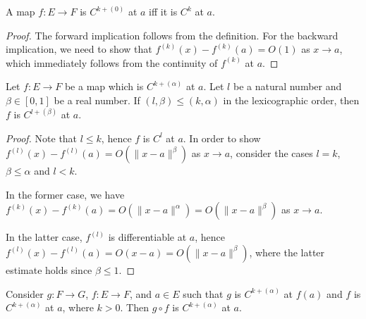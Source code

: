 \begin{lemma}%
  \label{lem:cdh-at-zero}
  A map \(f\colon E\to F\) is \(C^{k+(0)}\) at \(a\) iff it is \(C^{k}\) at \(a\).
\end{lemma}

\begin{proof}
  The forward implication follows from the definition.
  For the backward implication,
  we need to show that \(f^{(k)}(x) - f^{(k)}(a)=O(1)\) as \(x\to a\),
  which immediately follows from the continuity of \(f^{(k)}\) at \(a\).
\end{proof}

\begin{lemma}%
  \label{lem:cdh-at-mono}
  Let \(f\colon E\to F\) be a map which is \(C^{k+(\alpha)}\) at \(a\).
  Let \(l\) be a natural number and \(\beta \in [0, 1]\) be a real number.
  If \((l, \beta) \le (k, \alpha)\) in the lexicographic order,
  then \(f\) is \(C^{l+(\beta)}\) at \(a\).
\end{lemma}

\begin{proof}
  Note that \(l\le k\), hence \(f\) is \(C^{l}\) at \(a\).
  In order to show \(f^{(l)}(x) - f^{(l)}(a) = O(\|x - a\|^{\beta})\) as \(x\to a\),
  consider the cases \(l = k\), \(\beta \le \alpha\) and \(l < k\).

  In the former case, we have \(f^{(k)}(x) - f^{(k)}(a) = O\left(\|x - a\|^{\alpha}\right)=O\left(\|x - a\|^{\beta}\right)\) as \(x\to a\).

  In the latter case, \(f^{(l)}\) is differentiable at \(a\), hence \(f^{(l)}(x)-f^{(l)}(a)=O(x - a)=O(\|x - a\|^{\beta})\),
  where the latter estimate holds since \(\beta \le 1\).
\end{proof}

\begin{lemma}%
  \label{lem:cdh-at-comp}
  Consider \(g\colon F \to G\), \(f\colon E \to F\), and \(a \in E\)
  such that \(g\) is \(C^{k+(\alpha)}\) at \(f(a)\) and \(f\) is \(C^{k+(\alpha)}\) at \(a\), where \(k > 0\).
  Then \(g\circ f\) is \(C^{k+(\alpha)}\) at \(a\).
\end{lemma}

